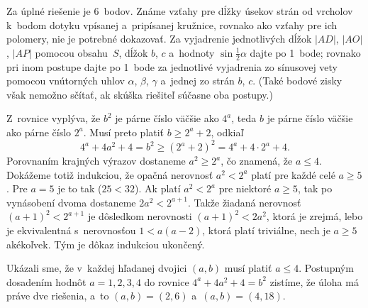 {\nobreak\medskip\petit\noindent
Za úplné riešenie je 6~bodov.
Známe vzťahy pre dĺžky úsekov strán od vrcholov k~bodom dotyku vpísanej
a~pripísanej kružnice, rovnako ako vzťahy pre ich polomery, nie je
potrebné dokazovať. Za vyjadrenie jednotlivých
dĺžok $|AD|$, $|AO|$, $|AP|$ pomocou obsahu~$S$, dĺžok
$b$, $c$ a~hodnoty $\sin\frac12\alpha$ dajte po 1~bode;
rovnako pri inom postupe dajte  po 1~bode
za jednotlivé vyjadrenia zo sínusovej vety pomocou vnútorných uhlov
$\alpha$, $\beta$, $\gamma$ a~jednej zo strán $b$, $c$. (Také bodové zisky
však nemožno sčítať, ak skúška riešiteľ súčasne oba postupy.)
\endpetit
}

{%
Z~rovnice vyplýva, že $b^2$ je párne číslo väčšie ako $4^a$, teda
$b$ je párne číslo väčšie ako párne číslo $2^a$. Musí preto
platiť $b\ge2^a+2$, odkiaľ
$$
4^a+4a^2+4=b^2\ge(2^a+2)^2=4^a+4\cdot2^a+4.
$$
Porovnaním krajných výrazov dostaneme $a^2\ge2^a$, čo znamená,
že $a\le4$. Dokážeme totiž indukciou, že opačná nerovnosť
$a^2<2^a$ platí pre každé celé $a\ge5$.
Pre ${a=5}$ je to tak ($25<32$). Ak platí
$a^2<2^a$ pre niektoré $a\ge5$, tak po vynásobení dvoma
dostaneme $2a^2<2^{a+1}$. Takže žiadaná nerovnosť $(a+1)^2<2^{a+1}$
je dôsledkom nerovnosti ${(a+1)^2}<2a^2$, ktorá je zrejmá, lebo je
ekvivalentná s~nerovnosťou $1<{a(a-2)}$, ktorá platí triviálne, nech je
$a\ge5$ akékoľvek. Tým je dôkaz indukciou ukončený.

Ukázali sme, že v~každej hľadanej dvojici $(a,b)$ musí platiť
$a\le4$. Postupným dosadením hodnôt $a=1,2,3,4$ do rovnice
$4^a+4a^2+4=b^2$ zistíme, že úloha má práve dve riešenia, a~to
$(a,b)=(2,6)$ a~$(a,b)=(4,18)$.
}

